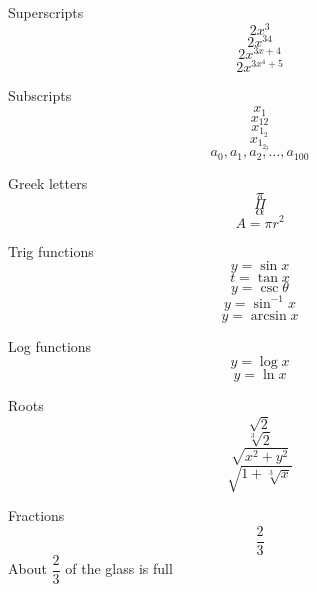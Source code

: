 \documentclass[11pt]{article}
\begin{document}
Superscripts 
$$2x^3$$ 
$$2x^{34}$$
$$2x^{3x+4}$$
$$2x^{3x^4+5}$$

Subscripts
$$x_1$$
$$x_{12}$$
$$x_{1_2}$$
$$x_{1_{2_3}}$$
$$a_0, a_1, a_2, \ldots, a_{100}$$

Greek letters
$$\pi$$
$$\Pi$$
$$\alpha$$
$$A=\pi r^2$$

Trig functions
$$y=\sin x$$
$$t=\tan x$$
$$y=\csc \theta$$
$$y=\sin^{-1}x$$
$$y=\arcsin x$$

Log functions
$$y=\log x$$
$$y=\ln x$$

Roots
$$\sqrt{2}$$
$$\sqrt[3]{2}$$
$$\sqrt{x^2+y^2}$$
$$\sqrt{ 1+\sqrt[3]{x}  }$$

Fractions
$$\frac{2}{3}$$
About $\dfrac{2}{3}$ of the glass is full
\end{document}
